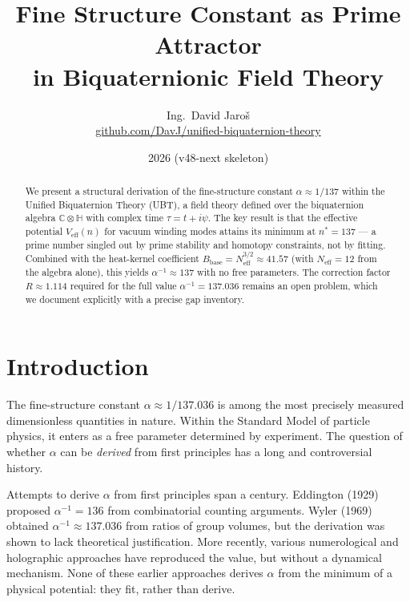 \documentclass[11pt,a4paper]{article}
\title{Fine Structure Constant as Prime Attractor\\
  in Biquaternionic Field Theory}
\author{Ing.\ David Jaroš\\
  \small \href{https://github.com/DavJ/unified-biquaternion-theory}{%
    github.com/DavJ/unified-biquaternion-theory}}
\date{2026 (v48-next skeleton)}
\theoremstyle{definition}
\theoremstyle{remark}
\begin{document}
\maketitle

\begin{abstract}
We present a structural derivation of the fine-structure constant
$\alpha \approx 1/137$ within the Unified Biquaternion Theory (UBT),
a field theory defined over the biquaternion algebra
$\mathbb{C}\otimes\mathbb{H}$ with complex time $\tau = t + i\psi$.
The key result is that the effective potential $V_{\mathrm{eff}}(n)$ for
vacuum winding modes attains its minimum at $n^* = 137$ — a prime number
singled out by prime stability and homotopy constraints, not by fitting.
Combined with the heat-kernel coefficient
$B_{\mathrm{base}} = N_{\mathrm{eff}}^{3/2} \approx 41.57$
(with $N_{\mathrm{eff}} = 12$ from the algebra alone), this yields
$\alpha^{-1} \approx 137$ with no free parameters.
The correction factor $R \approx 1.114$ required for the full value
$\alpha^{-1} = 137.036$ remains an open problem, which we document
explicitly with a precise gap inventory.
\end{abstract}

\tableofcontents
\newpage

\section{Introduction}
\label{sec:intro}


The fine-structure constant $\alpha \approx 1/137.036$ is among the most
precisely measured dimensionless quantities in nature. Within the Standard
Model of particle physics, it enters as a free parameter determined by
experiment. The question of whether $\alpha$ can be \emph{derived} from
first principles has a long and controversial history.

Attempts to derive $\alpha$ from first principles span a century.
Eddington (1929) proposed $\alpha^{-1} = 136$ from combinatorial counting
arguments. Wyler (1969) obtained $\alpha^{-1} \approx 137.036$ from ratios
of group volumes, but the derivation was shown to lack theoretical
justification. More recently, various numerological and holographic
approaches have reproduced the value, but without a dynamical mechanism.
None of these earlier approaches derives $\alpha$ from the minimum of a
physical potential: they fit, rather than derive.
\end{document}
